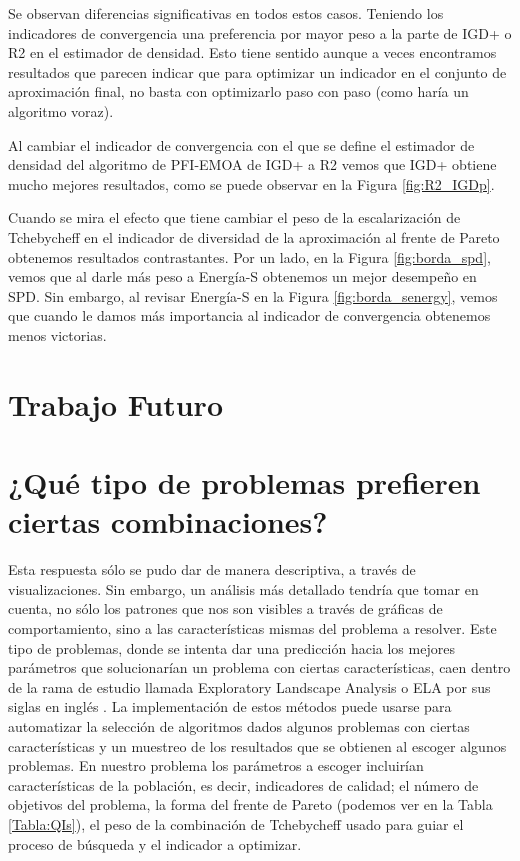 Se observan diferencias significativas en todos estos casos. Teniendo los indicadores de convergencia una preferencia por mayor peso a la parte de IGD+ o R2 en el estimador de densidad. Esto tiene sentido aunque a veces encontramos resultados que parecen indicar que para optimizar un indicador en el conjunto de aproximación final, no basta con optimizarlo paso con paso (como haría un algoritmo voraz).

Al cambiar el indicador de convergencia con el que se define el estimador de densidad del algoritmo de PFI-EMOA \cite{PFI} de IGD+ a R2 vemos que IGD+ obtiene mucho mejores resultados, como se puede observar en la Figura \ref{fig:R2_IGDp}.

Cuando se mira el efecto que tiene cambiar el peso de la escalarización de Tchebycheff en el indicador de diversidad de la aproximación al frente de Pareto obtenemos resultados contrastantes. Por un lado, en la Figura \ref{fig:borda_spd}, vemos que al darle más peso a Energía-S obtenemos un mejor desempeño en SPD. Sin embargo, al revisar Energía-S en la Figura \ref{fig:borda_senergy}, vemos que cuando le damos más importancia al indicador de convergencia obtenemos menos victorias.

\section{Trabajo Futuro}
\section*{¿Qué tipo de problemas prefieren ciertas combinaciones?}
Esta respuesta sólo se pudo dar de manera descriptiva, a través de visualizaciones. Sin embargo, un análisis más detallado tendría que tomar en cuenta, no sólo los patrones que nos son visibles a través de gráficas de comportamiento, sino a las características mismas del problema a resolver. Este tipo de problemas, donde se intenta dar una predicción hacia los mejores parámetros que solucionarían un problema con ciertas características, caen dentro de la rama de estudio llamada Exploratory Landscape Analysis o ELA por sus siglas en inglés \cite{trajanovExplainableLandscapeAnalysis2022}. La implementación de estos métodos puede usarse para automatizar la selección de algoritmos dados algunos problemas con ciertas características y un muestreo de los resultados que se obtienen al escoger algunos problemas. En nuestro problema los parámetros a escoger incluirían características de la población, es decir, indicadores de calidad; el número de objetivos del problema, la forma del frente de Pareto (podemos ver en la Tabla \ref{Tabla:QIs}), el peso de la combinación de Tchebycheff usado para guiar el proceso de búsqueda y el indicador a optimizar. 

